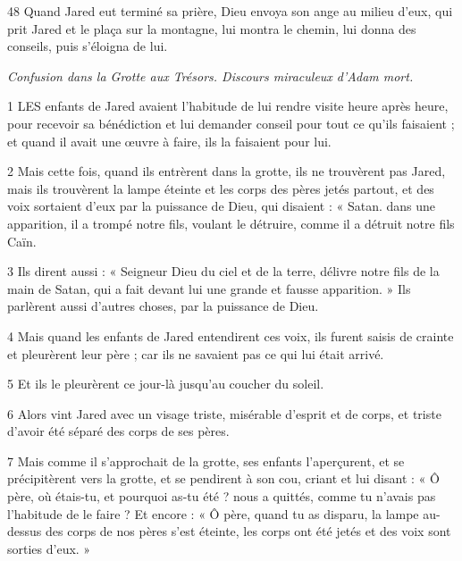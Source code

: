 \par 48 Quand Jared eut terminé sa prière, Dieu envoya son ange au milieu d'eux, qui prit Jared et le plaça sur la montagne, lui montra le chemin, lui donna des conseils, puis s'éloigna de lui.


\par \textit{Confusion dans la Grotte aux Trésors. Discours miraculeux d'Adam mort.}

\par 1 LES enfants de Jared avaient l'habitude de lui rendre visite heure après heure, pour recevoir sa bénédiction et lui demander conseil pour tout ce qu'ils faisaient ; et quand il avait une œuvre à faire, ils la faisaient pour lui.

\par 2 Mais cette fois, quand ils entrèrent dans la grotte, ils ne trouvèrent pas Jared, mais ils trouvèrent la lampe éteinte et les corps des pères jetés partout, et des voix sortaient d'eux par la puissance de Dieu, qui disaient : « Satan. dans une apparition, il a trompé notre fils, voulant le détruire, comme il a détruit notre fils Caïn.

\par 3 Ils dirent aussi : « Seigneur Dieu du ciel et de la terre, délivre notre fils de la main de Satan, qui a fait devant lui une grande et fausse apparition. » Ils parlèrent aussi d'autres choses, par la puissance de Dieu.

\par 4 Mais quand les enfants de Jared entendirent ces voix, ils furent saisis de crainte et pleurèrent leur père ; car ils ne savaient pas ce qui lui était arrivé.

\par 5 Et ils le pleurèrent ce jour-là jusqu'au coucher du soleil.

\par 6 Alors vint Jared avec un visage triste, misérable d'esprit et de corps, et triste d'avoir été séparé des corps de ses pères.

\par 7 Mais comme il s'approchait de la grotte, ses enfants l'aperçurent, et se précipitèrent vers la grotte, et se pendirent à son cou, criant et lui disant : « Ô père, où étais-tu, et pourquoi as-tu été ? nous a quittés, comme tu n’avais pas l’habitude de le faire ? Et encore : « Ô père, quand tu as disparu, la lampe au-dessus des corps de nos pères s'est éteinte, les corps ont été jetés et des voix sont sorties d'eux. »

